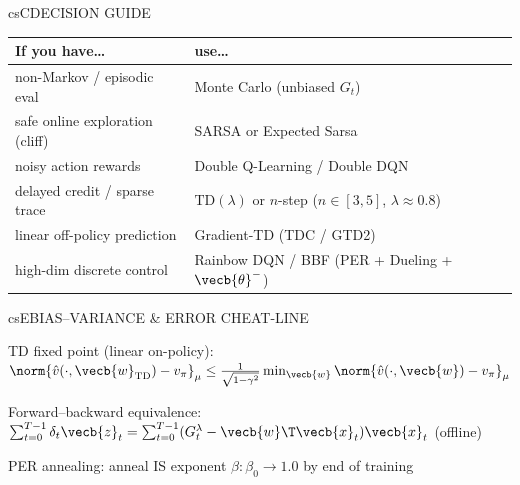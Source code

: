 \documentclass[../../../../master.tex]{subfiles}
\begin{document}
\begin{cscolumns}
\begin{cscard}{csC}{DECISION GUIDE}
  \renewcommand{\arraystretch}{1.22}\small
  \begin{tabular}{@{}>{\raggedright\arraybackslash}p{3.2cm}>{\raggedright\arraybackslash}p{4.6cm}@{}}
    \textbf{If you have\ldots} & \textbf{use\ldots}\\ \hline
    non-Markov / episodic eval & Monte Carlo (unbiased $G_t$)\\
    safe online exploration (cliff) & SARSA or Expected Sarsa\\
    noisy action rewards & Double Q-Learning / Double DQN\\
    delayed credit / sparse trace & $\mathrm{TD}(\lambda)$ or $n$-step ($n\in[3,5]$, $\lambda\approx 0.8$)\\
    linear off-policy prediction & Gradient-TD (TDC / GTD2)\\
    high-dim discrete control & Rainbow DQN / BBF (PER + Dueling + $\vecb{\theta}^-$)\\
  \end{tabular}
\end{cscard}

\begin{cscard}{csE}{BIAS--VARIANCE \& ERROR CHEAT-LINE}
  \begin{csbul}
    \item TD fixed point (linear on-policy): $\norm{\hat{v}(\cdot,\vecb{w}_{\mathrm{TD}}) - v_\pi}_\mu \le \frac{1}{\sqrt{1-\gamma^2}}\min_{\vecb{w}}\norm{\hat{v}(\cdot,\vecb{w})-v_\pi}_\mu$
    \item Forward--backward equivalence: $\sum_{t=0}^{T-1}\delta_t\vecb{z}_t = \sum_{t=0}^{T-1}(G_t^\lambda - \vecb{w}\T\vecb{x}_t)\vecb{x}_t$ (offline)
    \item PER annealing: anneal IS exponent $\beta: \beta_0 \to 1.0$ by end of training
  \end{csbul}
\end{cscard}


\end{cscolumns}
\end{document}
